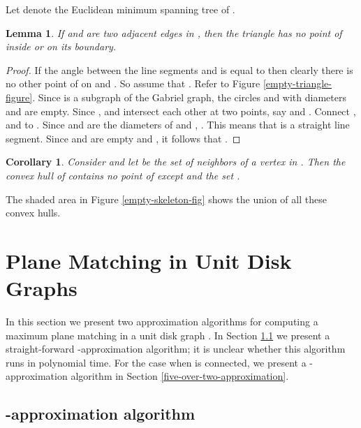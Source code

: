 \documentclass[11pt,a4paper]{article}
\newtheorem{lemma}{Lemma}
\newtheorem{corollary}{Corollary}
\begin{document}
Let  denote the Euclidean minimum spanning tree of .

\begin{lemma}
\label{empty-triangle-lemma}
If  and  are two adjacent edges in , then the triangle  has no point of  inside or on its boundary.
\end{lemma}
\begin{proof}
If the angle between the line segments  and  is equal to  then clearly there is no other point of  on  and . So assume that . Refer to Figure \ref{empty-triangle-figure}. Since  is a subgraph of the Gabriel graph, the circles  and  with diameters  and  are empty. Since ,  and  intersect each other at two points, say  and . Connect ,  and  to . Since  and  are the diameters of  and , .
This means that  is a straight line segment. Since  and  are empty and , it follows that .
\end{proof}

\begin{corollary}
\label{empty-convex-hull}
Consider  and let  be the set of neighbors of a vertex  in . Then the convex hull of  contains no point of  except  and the set .
\end{corollary}

The shaded area in Figure \ref{empty-skeleton-fig} shows the union of all these convex hulls.

\section{Plane Matching in Unit Disk Graphs}
\label{UDG}

In this section we present two approximation algorithms for computing a maximum plane matching in a unit disk graph . In Section \ref{three-approximation} we present a straight-forward -approximation algorithm; it is unclear whether this algorithm runs in polynomial time. For the case when  is connected, we present a -approximation algorithm in Section \ref{five-over-two-approximation}.

\subsection{-approximation algorithm}
\label{three-approximation}
\end{document}
